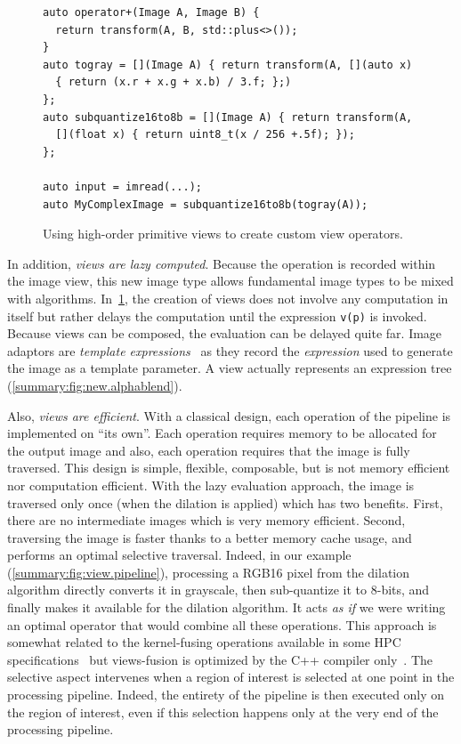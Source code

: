 \begin{figure}
  \begin{verbatim}
auto operator+(Image A, Image B) {
  return transform(A, B, std::plus<>());
}
auto togray = [](Image A) { return transform(A, [](auto x)
  { return (x.r + x.g + x.b) / 3.f; };)
};
auto subquantize16to8b = [](Image A) { return transform(A,
  [](float x) { return uint8_t(x / 256 +.5f); });
};

auto input = imread(...);
auto MyComplexImage = subquantize16to8b(togray(A));
  \end{verbatim}

  \caption[]{Using high-order primitive views to create custom view operators.}
  \label{summary:fig:view.highorder}
\end{figure}

In addition, \emph{views are lazy computed}. Because the operation is recorded within the image view, this new image
type allows fundamental image types to be mixed with algorithms. In~\cref{summary:fig:view.highorder}, the creation of
views does not involve any computation in itself but rather delays the computation until the expression \texttt{v(p)} is
invoked. Because views can be composed, the evaluation can be delayed quite far. Image adaptors are \emph{template
  expressions}~\parencite{veldhuizen.1995.expression, veldhuizen.2000.blitz} as they record the \emph{expression} used to
generate the image as a template parameter. A view actually represents an expression tree
(\cref{summary:fig:new.alphablend}).

Also, \emph{views are efficient}. With a classical design, each operation of the pipeline is implemented on ``its own''.
Each operation requires memory to be allocated for the output image and also, each operation requires that the image is
fully traversed. This design is simple, flexible, composable, but is not memory efficient nor computation efficient.
With the lazy evaluation approach, the image is traversed only once (when the dilation is applied) which has two
benefits. First, there are no intermediate images which is very memory efficient. Second, traversing the image is faster
thanks to a better memory cache usage, and performs an optimal selective traversal. Indeed, in our example
(\cref{summary:fig:view.pipeline}), processing a RGB16 pixel from the dilation algorithm directly converts it in
grayscale, then sub-quantize it to 8-bits, and finally makes it available for the dilation algorithm. It acts \emph{as
  if} we were writing an optimal operator that would combine all these operations. This approach is somewhat related to
the kernel-fusing operations available in some HPC specifications~\parencite{openvx.2019} but views-fusion is optimized
by the C++ compiler only~\parencite{brown.2018.ranges}. The selective aspect intervenes when a region of interest is
selected at one point in the processing pipeline. Indeed, the entirety of the pipeline is then executed only on the
region of interest, even if this selection happens only at the very end of the processing pipeline.

